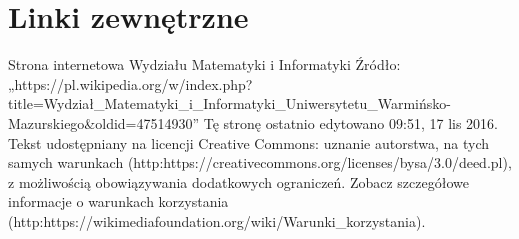 \documentclass[a4paper,12pt]{article}
\begin{document}
\section{Linki zewnętrzne}
Strona internetowa Wydziału Matematyki i Informatyki
Źródło: „https://pl.wikipedia.org/w/index.php?
title=Wydział_Matematyki_i_Informatyki_Uniwersytetu_Warmińsko-Mazurskiego&oldid=47514930”
Tę stronę ostatnio edytowano 09:51, 17 lis 2016. Tekst udostępniany na licencji Creative Commons:
uznanie autorstwa, na tych samych warunkach (http:https://creativecommons.org/licenses/bysa/3.0/deed.pl),
z możliwością obowiązywania dodatkowych ograniczeń. Zobacz szczegółowe
informacje o warunkach korzystania (http:https://wikimediafoundation.org/wiki/Warunki_korzystania).
\end{document}
